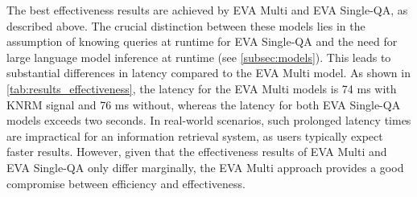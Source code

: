 \begin{enumerate}
    The best effectiveness results are achieved by EVA Multi and EVA Single-QA, as described above. The crucial distinction between these models lies in the assumption of knowing queries at runtime for EVA Single-QA and the need for large language model inference at runtime (see \autoref{subsec:models}). This leads to substantial differences in latency compared to the EVA Multi model. As shown in \autoref{tab:results_effectiveness}, the latency for the EVA Multi models is 74 ms with KNRM signal and 76 ms without, whereas the latency for both EVA Single-QA models exceeds two seconds. In real-world scenarios, such prolonged latency times are impractical for an information retrieval system, as users typically expect faster results. However, given that the effectiveness results of EVA Multi and EVA Single-QA only differ marginally, the EVA Multi approach provides a good compromise between efficiency and effectiveness.
\end{enumerate}